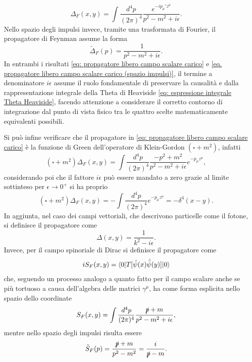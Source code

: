 \begin{equation}
\label{eq: propagatore libero campo scalare carico}
    \Delta_F(x,y) = \int\frac{d^4p}{(2\pi)^4}\frac{e^{-ip_\mu'z^\mu}}{p^2 - m^2 + i\epsilon}.
\end{equation}
Nello spazio degli impulsi invece, tramite una trasformata di Fourier, il propagatore di Feynman assume la forma
\begin{equation}
\label{eq. propagatore libero campo scalare carico (spazio impulsi)}
    \tilde{\Delta}_F(p) = \frac{1}{p^2 - m^2 + i\epsilon}.
\end{equation}
In entrambi i risultati \eqref{eq: propagatore libero campo scalare carico} e \eqref{eq. propagatore libero campo scalare carico (spazio impulsi)}, il termine a denominatore $i\epsilon$ assume il ruolo fondamentale di preservare la causalità e dalla rappresentazione integrale della Theta di Heaviside \eqref{eq: espressione integrale Theta Heaviside}, facendo attenzione a considerare il corretto contorno di integrazione dal punto di vista fisico tra le quattro scelte matematicamente equivalenti possibili.

Si può infine verificare che il propagatore in \eqref{eq: propagatore libero campo scalare carico} è la funzione di Green dell'operatore di Klein-Gordon $(\square + m^2)$, infatti
\begin{equation}
    (\square + m^2)\Delta_F(x,y) = \int\frac{d^4p}{(2\pi)^4}\frac{-p^2 + m^2}{p^2 - m^2 + i\epsilon}e^{-p_\mu z^\mu},
\end{equation}
considerando poi che il fattore $i\epsilon$ può essere mandato a zero grazie al limite sottinteso per $\epsilon\to0^+$ si ha proprio
\begin{equation}
     (\square + m^2)\Delta_F(x,y) = -\int\frac{d^4p}{(2\pi)^4}e^{-p_\mu z^\mu} = -\delta^4(x - y).
\end{equation}
In aggiunta, nel caso dei campi vettoriali, che descrivono particelle come il fotone, si definisce il propagatore come
\begin{equation}
    \Delta(x,y) = \frac{1}{k^2 - i\epsilon}.
\end{equation}
Invece, per il campo spinoriale di Dirac si definisce il propagatore come
\begin{equation}
    iS_F(x,y) = \langle 0 | T[\hat{\psi}(x)\hat{\bar{\psi}}(y)] | 0 \rangle
\end{equation}
che, seguendo un processo analogo a quanto fatto per il campo scalare anche se più tortuoso a causa dell'algebra delle matrici $\gamma^\mu$, ha come forma esplicita nello spazio dello coordinate 
\begin{equation}
\label{eq: propagatore campo spinoriale}
    S_F(x,y) = \int\frac{d^4p}{(2\pi)^4}\frac{\slashed{p} + m}{p^2 - m^2 + i\epsilon},
\end{equation}
mentre nello spazio degli impulsi risulta essere
\begin{equation}
    \tilde{S}_F(p) = \frac{\slashed{p} + m}{p^2 - m^2} = \frac{i}{\slashed{p} - m}. 
\end{equation}